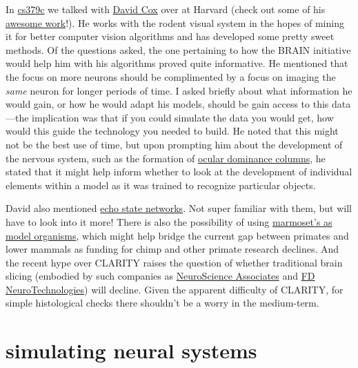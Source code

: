 		In \href{http://www.stanford.edu/class/cs379c/}{cs379c} we talked with \href{http://www.coxlab.org/}{David Cox} over at Harvard (check out some of his \href{http://www.coxlab.org/projects/subprojects/advanced\_electrode\_positioning/}{awesome work}!). He works with the rodent visual system in the hopes of mining it for better computer vision algorithms and has developed some pretty sweet methods. Of the questions asked, the one pertaining to how the BRAIN initiative would help him with his algorithms proved quite informative. He mentioned that the focus on more neurons should be complimented by a focus on imaging the \emph{same} neuron for longer periods of time. I asked briefly about what information he would gain,
		or how he would adapt his models, should be gain access to this data---the implication was that if you could simulate the data you would get, how would this guide the technology you needed to build. He noted that this might not be the best use of time, but upon prompting him about the development of the nervous system, such as the formation of \href{http://en.wikipedia.org/wiki/Ocular\_dominance\_column}{ocular dominance columns}, he stated that it might help inform whether to look at the development of individual elements within a model as it was trained to recognize particular objects.

		David also mentioned \href{http://en.wikipedia.org/wiki/Echo\_state\_network}{echo state networks}. Not super familiar with them, but will have to look into it more! There is also the possibility of using \href{http://www.nature.com/news/2009/090527/full/459492a.html}{marmoset's as model organisms}, which might help bridge the current gap between primates and lower mammals as funding for chimp and other primate research declines. And the recent hype over CLARITY\citep{chung2013structural} raises the question of whether traditional brain slicing (embodied by such companies as \href{http://www.neuroscienceassociates.com/}{NeuroScience Associates}
		and \href{http://fdneurotech.com/}{FD NeuroTechnologies}) will decline.
		Given the apparent difficulty of CLARITY, for simple histological checks there shouldn't be a worry in the medium-term.


	\section{simulating neural systems} %
	\label{sub:simulating_neural_systems}


